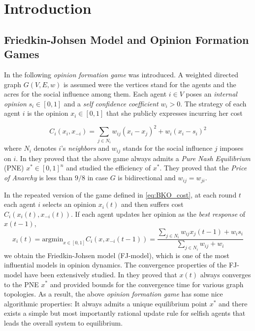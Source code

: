 \section{Introduction}

\subsection{Friedkin-Johsen Model and Opinion Formation Games}
In \cite{BKO11} the following \emph{opinion formation game} was introduced.
A weighted directed graph $G(V,E,w)$ is assumed were the vertices stand for the
agents and the acres for the social influence among them. Each agent $i \in V$ poses an
\emph{internal opinion} $s_i \in [0,1]$ and a \emph{self confidence coefficient} $w_i>0$. The strategy of
each agent $i$ is the opinion $x_i\in [0,1]$ that she publicly expresses incurring her cost

\begin{equation}\label{eq:BKO_cost}
  C_i(x_i,x_{-i}) = \sum_{j \in N_i}w_{ij}(x_i-x_j)^2 + w_i(x_i -s_i)^2
\end{equation}
\noindent where $N_i$ denotes $i$'s \emph{neighbors} and $w_{ij}$ stands for
the social influence $j$ imposes on $i$. In \cite{BKO11} they proved that
the above game always admits a \emph{Pure Nash Equilibrium} (PNE) $x^* \in [0,1]^n$
and studied the efficiency of $x^*$. They proved that the \emph{Price of Anarchy}
is less than $9/8$ in case $G$ is bidirectional and $w_{ij}=w_{ji}$.

In the repeated version of the game defined in \ref{eq:BKO_cost}, at each round $t$ each agent $i$
selects an opinion $x_i(t)$ and then suffers cost $C_i(x_i(t),x_{-i}(t))$. If each agent updates
her opinion as the \emph{best response} of $x(t-1)$,
\begin{equation}\label{eq:FJ_model}
x_i(t) = \text{argmin}_{x \in [0,1]}C_i(x,x_{-i}(t-1))=\frac{\sum_{j \in N_i}w_{ij}x_j(t-1) + w_is_i}{\sum_{j \in N_i}w_{ij} + w_i}
\end{equation}
\noindent we obtain the Friedkin-Johsen model (FJ-model), which is one of the most influential models in opinion dynamics.
The convergence properties of the FJ-model have been extensively studied. In \cite{GS14} they proved that $x(t)$ always converges
to the PNE $x^*$ and provided bounds for the convergence time for various graph topologies. As a result, the
above \emph{opinion formation game} has some nice algorithmic properties: It always admits a unique equilibrium point $x^*$ and there
exists a simple but most importantly rational update rule for selfish agents that leads the overall system to equilibrium.

